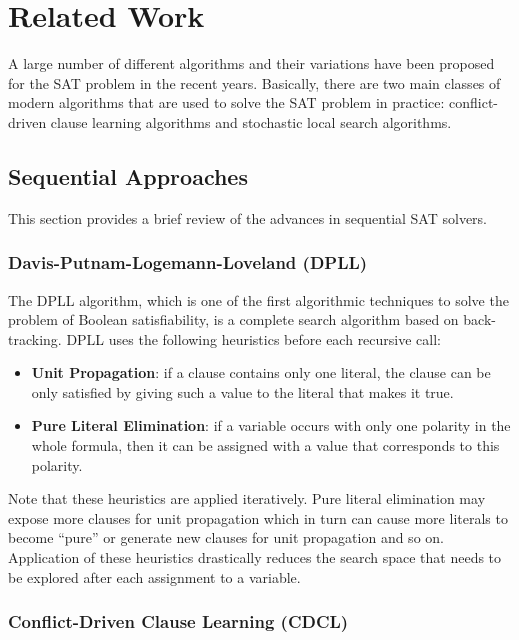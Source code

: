 \documentclass[letterpaper, compsoc, conference]{IEEEtran}
\begin{document}
\section{Related Work}
\label{sec:related}

A large number of different algorithms and their variations have been proposed for 
the SAT problem in the recent years. Basically, there are two main classes of modern 
algorithms that are used to solve the SAT problem in practice: conflict-driven 
clause learning algorithms and stochastic local search algorithms.

\subsection{Sequential Approaches}

This section provides a brief review of the advances in sequential SAT solvers.

\subsubsection{Davis-Putnam-Logemann-Loveland (DPLL)}

The DPLL algorithm, which is one of the first algorithmic techniques to solve
the problem of Boolean satisfiability, is a complete search algorithm based on
back-tracking. DPLL uses the following heuristics before each recursive call:

\begin{itemize}
\item \textbf{Unit Propagation}: if a clause contains only one literal, the clause 
can be only satisfied by giving such a value to the literal that makes it true. 

\item \textbf{Pure Literal Elimination}: if a variable occurs with only one
polarity in the whole formula, then it can be assigned with a value that
corresponds to this polarity.
\end{itemize}

Note that these heuristics are applied iteratively. Pure literal elimination may
expose more clauses for unit propagation which in turn can cause more literals
to become ``pure'' or generate new clauses for unit propagation and so on.
Application of these heuristics drastically reduces the search space that needs
to be explored after each assignment to a variable.

\subsubsection{Conflict-Driven Clause Learning (CDCL)}
\end{document}
